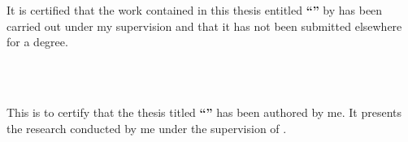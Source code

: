 \documentclass[12pt, a4paper, twoside]{Thesis} %
\begin{document}

\setcounter{page}{2}

\begin{minipage}{\textwidth}
    
    It is certified that the work contained in this thesis entitled \textbf{\enquote{\ttitle}} by \textbf{\authornames} has been carried out under my supervision and that it has not been submitted elsewhere for a degree.
        
\end{minipage}

\vspace{20.00mm}

\begin{minipage}{0.49\textwidth}
    \begin{flushleft}
        {\supnameA\\ 
        \deptname\\
        \univname}
    \end{flushleft}
\end{minipage}

\vspace{1em} %


\vfill
\clearpage %

This is to certify that the thesis titled \textbf{``\ttitle''} has been authored by me. It presents the research conducted by me under the supervision of \textbf{\supnameA}.\par
\end{document}
